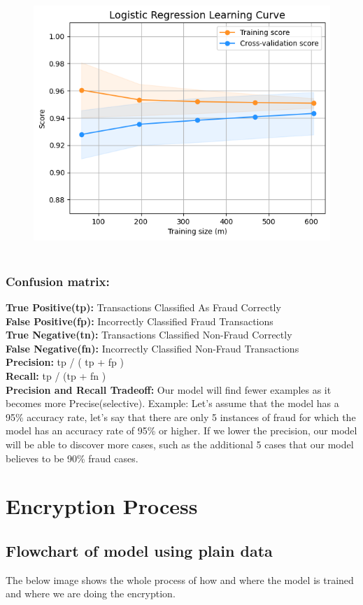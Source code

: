 \documentclass{article}
\begin{document}
\begin{figure}[!h]
\centering
\includegraphics[width = 2.8 in]{img8.png}~
\end{figure}

\subsubsection{Confusion matrix:}
\textbf{True Positive(tp):} Transactions Classified As Fraud Correctly\\
\textbf{False Positive(fp):} Incorrectly Classified Fraud Transactions\\
\textbf{True Negative(tn):} Transactions Classified Non-Fraud Correctly\\
\textbf{False Negative(fn):} Incorrectly Classified Non-Fraud Transactions\\
\textbf{Precision:} tp / ( tp + fp )\\
\textbf{Recall:} tp / (tp + fn )\\

\noindent\textbf{Precision and Recall Tradeoff:} Our model will find fewer examples as it becomes more Precise(selective). Example: Let's assume that the model has a 95\% accuracy rate, let's say that there are only 5 instances of fraud for which the model has an accuracy rate of 95\% or higher. If we lower the precision, our model will be able to discover more cases, such as the additional 5 cases that our model believes to be 90\% fraud cases.


\section{Encryption Process}

\subsection{Flowchart of model using plain data}

The below image shows the whole process of how and where the model is trained and where we are doing the encryption.
\end{document}

